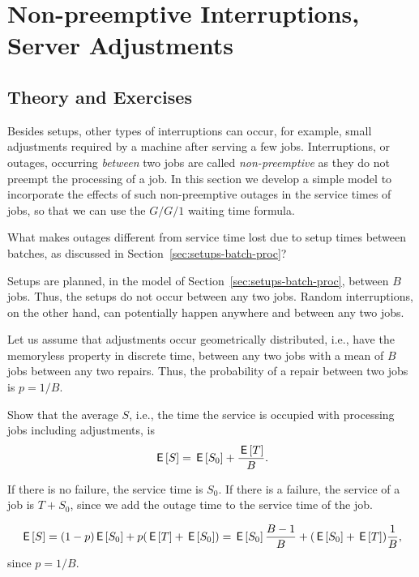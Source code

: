 \section{Non-preemptive Interruptions, Server Adjustments}
\label{sec:non-preempt-interr}

\subsection*{Theory and Exercises}



Besides setups, other types of interruptions can occur, for example, small adjustments required by a machine after serving a few jobs.  Interruptions, or outages, occurring \emph{between} two jobs are called \emph{non-preemptive} as they do not preempt the processing of a job.  In this section we develop a simple model to incorporate the effects of such non-preemptive outages in the service times of jobs, so that we can use the $G/G/1$ waiting time formula. 


\begin{exercise}
  What makes outages different from service time lost due to setup times between batches, as discussed in Section~\ref{sec:setups-batch-proc}?  
  \begin{solution}
Setups are planned, in the model of Section~\ref{sec:setups-batch-proc}, between $B$ jobs. Thus, the setups do not occur between any two jobs.  Random interruptions, on the other hand, can potentially happen anywhere and between any two jobs. 
  \end{solution}
\end{exercise}


Let us assume that adjustments occur geometrically distributed, i.e., have the memoryless property in discrete time, between any two jobs with a mean of $B$ jobs between any two repairs.  Thus, the probability of a repair between two jobs is $p=1/B$. 

\begin{exercise}
  Show that the average  $S$, i.e., the time the service is occupied with processing jobs including adjustments, is 
  \begin{equation*}
    \,\mathsf{E}\left[S\right] = \,\mathsf{E}\left[S_0\right] + \frac{\,\mathsf{E}\left[T\right]}B.
  \end{equation*}
\begin{hint}
If there is no failure, the service time is $S_0$. If there is a failure, the service of a job is $T + S_0$, since we add the outage time to the service time of the job. 
\end{hint}
  \begin{solution}
    \begin{equation*}
      \,\mathsf{E}\left[S\right] = (1-p)\,\mathsf{E}\left[S_0\right] + p (\,\mathsf{E}\left[T\right] + \,\mathsf{E}\left[S_0\right]) = \,\mathsf{E}\left[S_0\right] \frac{B-1}B + (\,\mathsf{E}\left[S_0\right] + \,\mathsf{E}\left[T\right]) \frac 1B,
    \end{equation*}
since $p=1/B$. 
  \end{solution}
\end{exercise}

